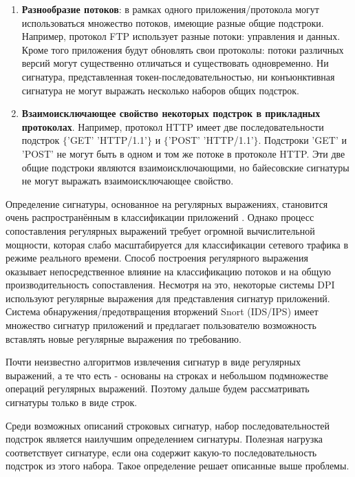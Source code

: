 \begin{enumerate}
    \item \textbf{Разнообразие потоков}: в рамках одного приложения/протокола могут использоваться множество потоков,
    имеющие разные общие подстроки. Например, протокол FTP использует разные потоки: управления и данных.
    Кроме того приложения будут обновлять свои протоколы: потоки различных версий могут существенно отличаться и существовать одновременно.
    Ни сигнатура, представленная токен-последовательностью,
    ни конъюнктивная сигнатура не могут выражать несколько наборов общих подстрок.
    \item \textbf{Взаимоисключающее свойство некоторых подстрок в прикладных протоколах}.
    Например, протокол HTTP имеет две последовательности подстрок $\{$'GET' 'HTTP/1.1'$\}$ и $\{$'POST' 'HTTP/1.1'$\}$.
    Подстроки 'GET' и 'POST' не могут быть в одном и том же потоке в протоколе HTTP.
    Эти две общие подстроки являются взаимоисключающими, но байесовские сигнатуры не могут выражать взаимоисключающее свойство.
\end{enumerate}

Определение сигнатуры, основанное на регулярных выражениях, становится очень распространённым в классификации приложений
\cite{szabo2012automatic, wang2012generating, vinothgeorge2013efficient}.
Однако процесс сопоставления регулярных выражений требует огромной вычислительной мощности,
которая слабо масштабируется для классификации сетевого трафика в режиме реального времени.
Способ построения регулярного выражения оказывает непосредственное влияние на классификацию потоков
и на общую производительность сопоставления.
Несмотря на это, некоторые системы DPI используют регулярные выражения для представления сигнатур приложений.
Система обнаружения/предотвращения вторжений Snort (IDS/IPS) \cite{Snort}
имеет множество сигнатур приложений и предлагает пользователю возможность вставлять новые регулярные выражения по требованию.

Почти неизвестно алгоритмов извлечения сигнатур в виде регулярных выражений, а те что есть -
основаны на строках и небольшом подмножестве операций регулярных выражений.
Поэтому дальше будем рассматривать сигнатуры только в виде строк.

Среди возможных описаний строковых сигнатур, набор последовательностей подстрок является наилучшим определением сигнатуры.
Полезная нагрузка соответствует сигнатуре, если она содержит какую-то последовательность подстрок из этого набора.
Такое определение решает описанные выше проблемы.

